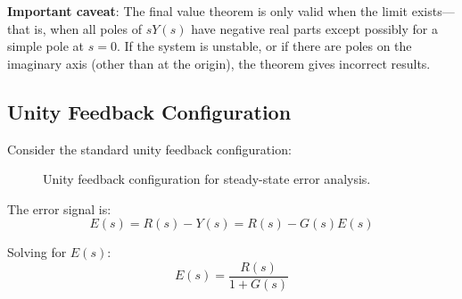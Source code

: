 \textbf{Important caveat}: The final value theorem is only valid when the limit exists---that is, when all poles of $sY(s)$ have negative real parts except possibly for a simple pole at $s = 0$. If the system is unstable, or if there are poles on the imaginary axis (other than at the origin), the theorem gives incorrect results.

\subsection{Unity Feedback Configuration}

Consider the standard unity feedback configuration:

\begin{figure}[H]
\centering
{}
\caption{Unity feedback configuration for steady-state error analysis.}
\label{fig:unity_feedback}
\end{figure}

The error signal is:
\begin{equation}
    E(s) = R(s) - Y(s) = R(s) - G(s)E(s)
\end{equation}

Solving for $E(s)$:
\begin{equation}
    E(s) = \frac{R(s)}{1 + G(s)}
    \label{eq:error_transfer}
\end{equation}

